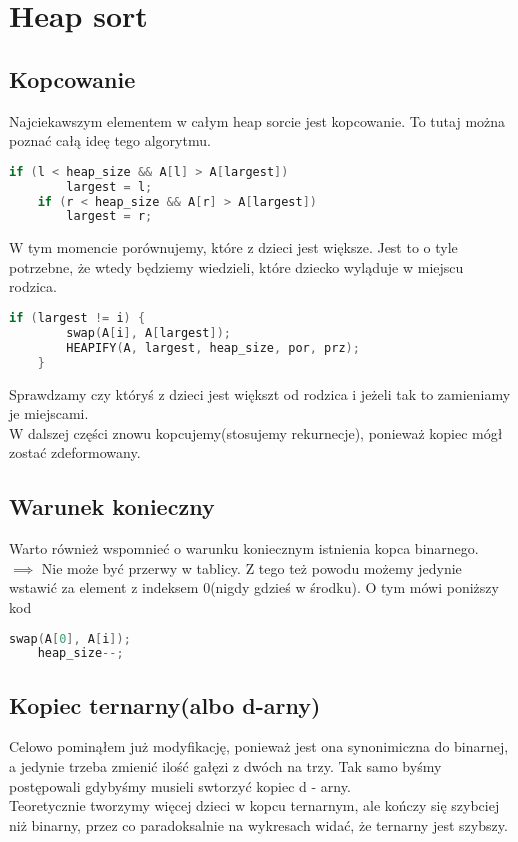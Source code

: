 \documentclass[12pt,a4paper]{article}
\begin{document}
\section{Heap sort}
\subsection{Kopcowanie}
Najciekawszym elementem w całym heap sorcie jest kopcowanie. To tutaj można poznać całą ideę tego algorytmu.
\begin{lstlisting}[language=C++]
    if (l < heap_size && A[l] > A[largest])
        largest = l;
    if (r < heap_size && A[r] > A[largest])
        largest = r;
\end{lstlisting}
W tym momencie porównujemy, które z dzieci jest większe. Jest to o tyle potrzebne, że wtedy będziemy wiedzieli, które dziecko wyląduje w miejscu rodzica.
\begin{lstlisting}[language=C++]
    if (largest != i) {
        swap(A[i], A[largest]);
        HEAPIFY(A, largest, heap_size, por, prz);
    }
\end{lstlisting}
Sprawdzamy czy któryś z dzieci jest większt od rodzica i jeżeli tak to zamieniamy je miejscami.\\
W dalszej części znowu kopcujemy(stosujemy rekurnecje), ponieważ kopiec mógł zostać zdeformowany.
\subsection{Warunek konieczny}
Warto również wspomnieć o warunku koniecznym istnienia kopca binarnego.\\
$\implies$ Nie może być przerwy w tablicy. Z tego też powodu możemy jedynie wstawić za element z indeksem 0(nigdy gdzieś w środku). O tym mówi poniższy kod
\begin{lstlisting}[language=C++]
    swap(A[0], A[i]);
    heap_size--;
\end{lstlisting}
\subsection{Kopiec ternarny(albo d-arny)}
Celowo pominąłem już modyfikację, ponieważ jest ona synonimiczna do binarnej, a jedynie trzeba zmienić ilość gałęzi z dwóch na trzy. Tak samo byśmy postępowali gdybyśmy musieli swtorzyć kopiec d - arny.\\
Teoretycznie tworzymy więcej dzieci w kopcu ternarnym, ale kończy się szybciej niż binarny, przez co paradoksalnie na wykresach widać, że ternarny jest szybszy.
\clearpage
\end{document}
